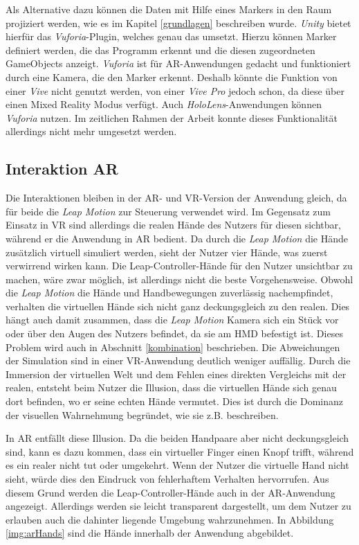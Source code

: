 Als Alternative dazu können die Daten mit Hilfe eines Markers in den Raum projiziert werden, wie es im Kapitel \ref{grundlagen} beschreiben wurde. \textit{Unity} bietet hierfür das \textit{Vuforia}-Plugin, welches genau das umsetzt. Hierzu können Marker definiert werden, die das Programm erkennt und die diesen zugeordneten GameObjects anzeigt. 
\textit{Vuforia} ist für AR-Anwendungen gedacht und funktioniert durch eine Kamera, die den Marker erkennt. Deshalb könnte die Funktion von einer \textit{Vive} nicht genutzt werden, von einer \textit{Vive Pro} jedoch schon, da diese über einen Mixed Reality Modus verfügt. Auch \textit{HoloLens}-Anwendungen können \textit{Vuforia} nutzen. 
Im zeitlichen Rahmen der Arbeit konnte dieses Funktionalität allerdings nicht mehr umgesetzt werden.

\subsection{Interaktion AR}

Die Interaktionen bleiben in der AR- und VR-Version der Anwendung gleich, da für beide die \textit{Leap Motion} zur Steuerung verwendet wird.
Im Gegensatz zum Einsatz in VR sind allerdings die realen Hände des Nutzers für diesen sichtbar, während er die Anwendung in AR bedient. Da durch die \textit{Leap Motion} die Hände zusätzlich virtuell simuliert werden, sieht der Nutzer vier Hände, was zuerst verwirrend wirken kann. 
Die Leap-Controller-Hände für den Nutzer unsichtbar zu machen, wäre zwar möglich, ist allerdings nicht die beste Vorgehensweise. Obwohl die \textit{Leap Motion} die Hände und Handbewegungen zuverlässig nachempfindet, verhalten die virtuellen Hände sich nicht ganz deckungsgleich zu den realen. Dies hängt auch damit zusammen, dass die \textit{Leap Motion} Kamera sich ein Stück vor oder über den Augen des Nutzers befindet, da sie am HMD befestigt ist. Dieses Problem wird auch in Abschnitt \ref{kombination} beschrieben.
Die Abweichungen der Simulation sind in einer VR-Anwendung deutlich weniger auffällig. Durch die Immersion der virtuellen Welt und dem Fehlen eines direkten Vergleichs mit der realen, entsteht beim Nutzer die Illusion, dass die virtuellen Hände sich genau dort befinden, wo er seine echten Hände vermutet. Dies ist durch die Dominanz der visuellen Wahrnehmung begründet, wie sie z.B. \cite{Azmandian16} beschreiben.

In AR entfällt diese Illusion. Da die beiden Handpaare aber nicht deckungsgleich sind, kann es dazu kommen, dass ein virtueller Finger einen Knopf trifft, während es ein realer nicht tut oder umgekehrt. Wenn der Nutzer die virtuelle Hand nicht sieht, würde dies den Eindruck von fehlerhaftem Verhalten hervorrufen. 
Aus diesem Grund werden die Leap-Controller-Hände auch in der AR-Anwendung angezeigt. Allerdings werden sie leicht transparent dargestellt, um dem Nutzer zu erlauben auch die dahinter liegende Umgebung wahrzunehmen. 
In Abbildung \ref{img:arHands} sind die Hände innerhalb der Anwendung abgebildet.

